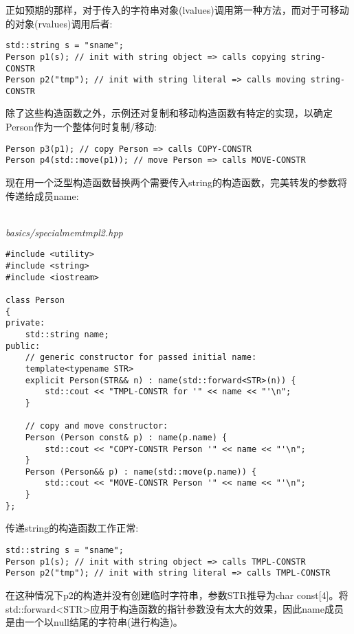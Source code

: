 正如预期的那样，对于传入的字符串对象(lvalues)调用第一种方法，而对于可移动的对象(rvalues)调用后者:

\begin{lstlisting}[style=styleCXX]
std::string s = "sname";
Person p1(s); // init with string object => calls copying string-CONSTR
Person p2("tmp"); // init with string literal => calls moving string-CONSTR
\end{lstlisting}

除了这些构造函数之外，示例还对复制和移动构造函数有特定的实现，以确定Person作为一个整体何时复制/移动:

\begin{lstlisting}[style=styleCXX]
Person p3(p1); // copy Person => calls COPY-CONSTR
Person p4(std::move(p1)); // move Person => calls MOVE-CONSTR
\end{lstlisting}

现在用一个泛型构造函数替换两个需要传入string的构造函数，完美转发的参数将传递给成员name:

\hspace*{\fill} \\ %
\noindent
\textit{basics/specialmemtmpl2.hpp}
\begin{lstlisting}[style=styleCXX]
#include <utility>
#include <string>
#include <iostream>

class Person
{
private:
	std::string name;
public:
	// generic constructor for passed initial name:
	template<typename STR>
	explicit Person(STR&& n) : name(std::forward<STR>(n)) {
		std::cout << "TMPL-CONSTR for '" << name << "'\n";
	}

	// copy and move constructor:
	Person (Person const& p) : name(p.name) {
		std::cout << "COPY-CONSTR Person '" << name << "'\n";
	}
	Person (Person&& p) : name(std::move(p.name)) {
		std::cout << "MOVE-CONSTR Person '" << name << "'\n";
	}
};
\end{lstlisting}

传递string的构造函数工作正常:

\begin{lstlisting}[style=styleCXX]
std::string s = "sname";
Person p1(s); // init with string object => calls TMPL-CONSTR
Person p2("tmp"); // init with string literal => calls TMPL-CONSTR
\end{lstlisting}

在这种情况下p2的构造并没有创建临时字符串，参数STR推导为char const[4]。将std::forward<STR>应用于构造函数的指针参数没有太大的效果，因此name成员是由一个以null结尾的字符串(进行构造)。

